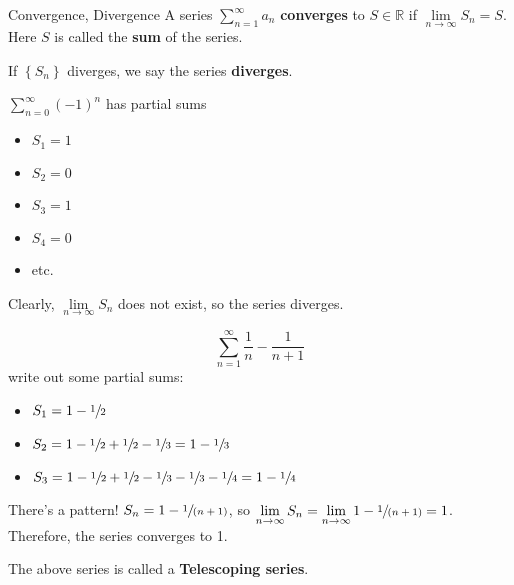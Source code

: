 \begin{Definition}{Convergence, Divergence}{}
    A series $ \sum\limits_{n=1}^{\infty} a_n $ \textbf{converges} to $ S\in\mathbb{R} $
    if $ \lim\limits_{{n} \to {\infty}} S_n=S $. Here $ S $ is called the \textbf{sum}
    of the series.

    If $ \left\{ S_n\right\} $ diverges, we say the series \textbf{diverges}.
\end{Definition}

\begin{Example}{}{}
    $ \sum_{n=0}^{\infty}(-1)^n $ has partial sums
    \begin{itemize}
        \item $ S_1=1 $
        \item $ S_2=0 $
        \item $ S_3=1 $
        \item $ S_4=0 $
        \item etc.
    \end{itemize}
    Clearly, $ \lim\limits_{{n} \to {\infty}} S_n $ does not exist, so
    the series diverges.
\end{Example}

\begin{Example}{}{}
    \[ \sum\limits_{n=1}^{\infty} \frac{1}{n} -\frac{1}{n+1}  \]
    write out some partial sums:
    \begin{itemize}
        \item $ S_1=1-\sfrac{1}{2} $
        \item $ S_2=1-\sfrac{1}{2} +\sfrac{1}{2}-\sfrac{1}{3}=1-\sfrac{1}{3} $
        \item $ S_3=1-\sfrac{1}{2} +\sfrac{1}{2} -\sfrac{1}{3} -\sfrac{1}{3} -\sfrac{1}{4}=1-\sfrac{1}{4} $
    \end{itemize}
    There's a pattern! $ S_n=1-\sfrac{1}{(n+1)} $, so $ \lim\limits_{{n} \to {\infty}} S_n=
        \lim\limits_{{n} \to {\infty}} 1-\sfrac{1}{(n+1)}=1 $. Therefore, the series
    converges to 1.
\end{Example}

\begin{Remark}{}{}
    The above series is called a \textbf{Telescoping series}.
\end{Remark}

